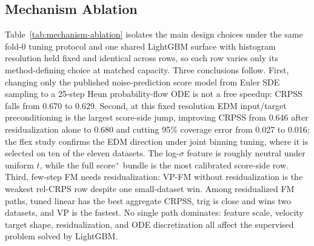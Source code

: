 \documentclass{article}
\begin{document}
\subsection{Mechanism Ablation}\label{sec:mechanism-ablation}
Table~\ref{tab:mechanism-ablation} isolates the main design choices under the same fold-0 tuning protocol and one shared LightGBM surface with histogram resolution held fixed and identical across rows, so each row varies only its method-defining choice at matched capacity. Three conclusions follow. First, changing only the published noise-prediction score model from Euler SDE sampling to a 25-step Heun probability-flow ODE is not a free speedup: CRPSS falls from 0.670 to 0.629. Second, at this fixed resolution EDM input/target preconditioning is the largest score-side jump, improving CRPSS from 0.646 after residualization alone to 0.680 and cutting 95\% coverage error from 0.027 to 0.016; the flex study confirms the EDM direction under joint binning tuning, where it is selected on ten of the eleven datasets. The log-$\sigma$ feature is roughly neutral under uniform $t$, while the full score$^+$ bundle is the most calibrated score-side row. Third, few-step FM needs residualization: VP-FM without residualization is the weakest rel-CRPS row despite one small-dataset win. Among residualized FM paths, tuned linear has the best aggregate CRPSS, trig is close and wins two datasets, and VP is the fastest. No single path dominates: feature scale, velocity target shape, residualization, and ODE discretization all affect the supervised problem solved by LightGBM.
\end{document}
